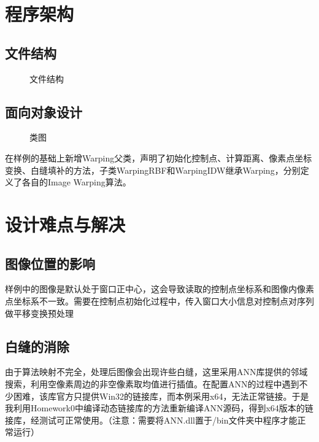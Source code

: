 \documentclass[14pt]{scrartcl} %
\begin{document}
	
	\pagebreak
	\section{程序架构}
	\subsection{文件结构}
	\begin{figure}[h] %
		\centering
		\caption{文件结构}
	\end{figure}
	
	
	\pagebreak
	\subsection{面向对象设计}
	
	\begin{figure}[h] %
		\centering
		\caption{类图}
	\end{figure}
	
	在样例的基础上新增Warping父类，声明了初始化控制点、计算距离、像素点坐标变换、白缝填补的方法，子类WarpingRBF和WarpingIDW继承Warping，分别定义了各自的Image Warping算法。
	
	\pagebreak
	\section{设计难点与解决}
	
	\subsection{图像位置的影响}
	
	样例中的图像是默认处于窗口正中心，这会导致读取的控制点坐标系和图像内像素点坐标系不一致。需要在控制点初始化过程中，传入窗口大小信息对控制点对序列做平移变换预处理
	
	\subsection{白缝的消除}
	
	由于算法映射不完全，处理后图像会出现许些白缝，这里采用ANN库提供的邻域搜索，利用空像素周边的非空像素取均值进行插值。在配置ANN的过程中遇到不少困难，该库官方只提供Win32的链接库，而本例采用x64，无法正常链接。于是我利用Homework0中编译动态链接库的方法重新编译ANN源码，得到x64版本的链接库，经测试可正常使用。（注意：需要将ANN.dll置于/bin文件夹中程序才能正常运行）
	
\end{document}

